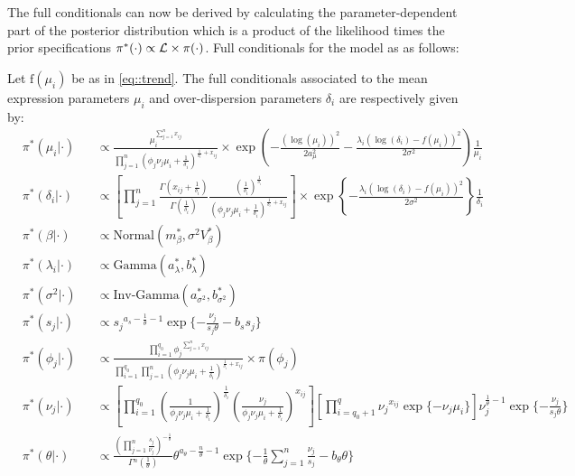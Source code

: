 \newpage

The full conditionals can now be derived by calculating the parameter-dependent part of the posterior distribution which is a product of the likelihood times the prior specifications $\pi^\ast(\cdot)\propto{}\mathcal{L}\times\pi(\cdot)$. Full conditionals for the model as as follows: 

Let $\text{f}(\mu_i)$ be as in \ref{eq::trend}. The full conditionals associated to the mean expression parameters $\mu_i$ and over-dispersion parameters $\delta_i$ are respectively given by:\\

\begingroup
\addtolength{\jot}{0.8em}
\begin{align*} \label{eq::FullCond}
&\pi^*(\mu_i|\cdot) && \propto \frac{\mu_i^{\sum_{j=1}^n{}x_{ij}}}{\prod_{j=1}^n{}(\phi_j\nu_j\mu_i+\frac{1}{\delta_i})^{\frac{1}{\delta_i}+x_{ij}}}\times{}\exp\left(-\frac{(\log(\mu_i))^2}{2a_\mu^2}-\frac{\lambda_i(\log(\delta_i)-f(\mu_i))^2}{2\sigma^2}\right)\frac{1}{\mu_i} \\
&\pi^*(\delta_i|\cdot) && \propto \left[\prod_{j=1}^n\frac{\Gamma(x_{ij}+\frac{1}{\delta_i})}{\Gamma(\frac{1}{\delta_i})}\frac{(\frac{1}{\delta_i})^{\frac{1}{\delta_i}}}{(\phi_j\nu_j\mu_i+\frac{1}{\delta_i})^{\frac{1}{\delta_i}+x_{ij}}}\right]\times{}\exp\left\lbrace-\frac{\lambda_i(\log(\delta_i)-f(\mu_i))^2}{2\sigma^2}\right\rbrace\frac{1}{\delta_i}\\
&\pi^*(\beta|\cdot)&&\propto{}\text{Normal}(m^*_\beta,\sigma^2V^*_\beta)\\
&\pi^*(\lambda_i|\cdot)&&\propto{}\text{Gamma}(a^*_\lambda,b^*_\lambda)\\
&\pi^*(\sigma^2|\cdot)&&\propto{}\text{Inv-Gamma}(a^*_{\sigma^2},b^*_{\sigma^2})\\
&\pi^*(s_j|\cdot)&&\propto{}s_j{}^{a_s-\frac{1}{\theta}-1}\exp\lbrace-\frac{\nu_j}{s_j\theta}-b_ss_j\rbrace\\
&\pi^*(\phi_j|\cdot)&&\propto{}\frac{\prod_{i=1}^{q_0}\phi_j{}^{\sum_{j=1}^nx_{ij}}}{\prod_{i=1}^{q_0}\prod_{j=1}^{n}(\phi_j\nu_j\mu_i+\frac{1}{\delta_i})^{\frac{1}{\delta_i}+x_{ij}}}\times{}\pi(\phi_j)\\
&\pi^*(\nu_j|\cdot)&&\propto{}\left[\prod_{i=1}^{q_0}\left(\frac{1}{\phi_j\nu_j\mu_i+\frac{1}{\delta_i}}\right)^\frac{1}{\delta_i}\left(\frac{\nu_j}{\phi_j\nu_j\mu_i+\frac{1}{\delta_i}}\right)^{x_{ij}}\right]\left[\prod_{i=q_0+1}^{q}\nu_j{}^{x_{ij}}\exp\lbrace-\nu_j\mu_i\rbrace\right]\nu_j^{\frac{1}{\theta}-1}\exp\lbrace-\frac{\nu_j}{s_j\theta}\rbrace\\
&\pi^*(\theta|\cdot)&&\propto{}\frac{\left(\prod_{j=1}^{n}\frac{s_j}{\nu_j}\right)^{-\frac{1}{\theta}}}{\Gamma{}^n(\frac{1}{\theta})}\theta^{a_\theta-\frac{n}{\theta}-1}\exp\lbrace-\frac{1}{\theta}\sum_{j=1}^n\frac{\nu_j}{s_j}-b_\theta\theta\rbrace
\end{align*}
\endgroup

